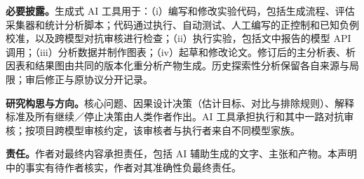 \documentclass{article}
\begin{document}
\textbf{必要披露。}生成式 AI 工具用于：（i）编写和修改实验代码，包括生成流程、评估采集器和统计分析脚本；代码通过执行、自动测试、人工编写的正控制和已知负例校准，以及跨模型对抗审核进行检查；（ii）执行实验，包括文中报告的模型 API 调用；（iii）分析数据并制作图表；（iv）起草和修改论文。修订后的主分析表、析因表和结果图由共同的版本化重分析产物生成。历史探索性分析保留各自来源与局限；审后修正与原协议分开记录。

\textbf{研究构思与方向。}核心问题、因果设计决策（估计目标、对比与排除规则）、解释标准及所有继续／停止决策由人类作者作出。AI 工具承担执行和其中一路对抗审核；按项目跨模型审核约定，该审核者与执行者来自不同模型家族。

\textbf{责任。}作者对最终内容承担责任，包括 AI 辅助生成的文字、主张和产物。本声明中的事实有待作者核实，作者对其准确性负最终责任。


\appendix


\end{document}
